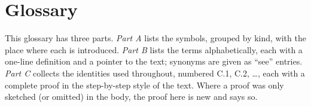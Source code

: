 \clearpage
\section*{Glossary}\label{sec:glossary}

This glossary has three parts. \emph{Part A} lists the symbols, grouped by kind, with the place where each is introduced.
\emph{Part B} lists the terms alphabetically, each with a one-line definition and a pointer to the text; synonyms are given as
``see'' entries. \emph{Part C} collects the identities used throughout, numbered C.1, C.2, \dots, each with a complete proof in the
step-by-step style of the text. Where a proof was only sketched (or omitted) in the body, the proof here is new and says so.










